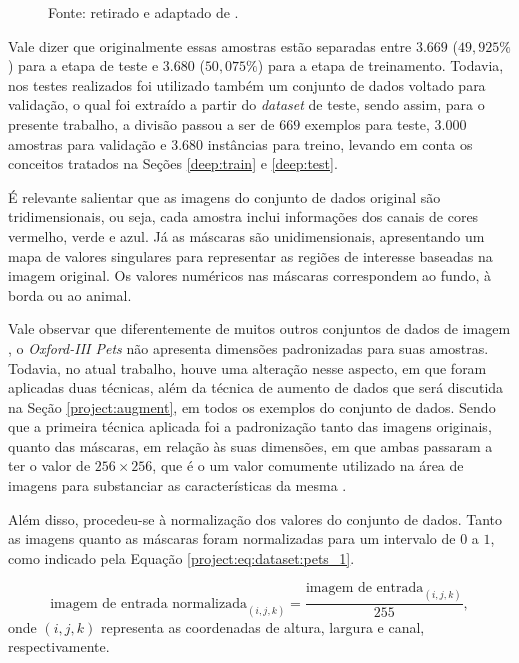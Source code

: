 \begin{figure}[H]
    Fonte: retirado e adaptado de \cite{Parkhi2012CatsDogs}.
\end{figure}

Vale dizer que originalmente essas amostras estão separadas entre $3.669$ ($49,925\%$) para a etapa de teste e $3.680$ ($50,075\%$) para a etapa de treinamento. Todavia, nos testes realizados foi utilizado também um conjunto de dados voltado para validação, o qual foi extraído a partir do \textit{dataset} de teste, sendo assim, para o presente trabalho, a divisão passou a ser de $669$ exemplos para teste, 3.000 amostras para validação e 3.680 instâncias para treino, levando em conta os conceitos tratados na Seções \ref{deep:train} e \ref{deep:test}.

É relevante salientar que as imagens do conjunto de dados original são tridimensionais, ou seja, cada amostra inclui informações dos canais de cores vermelho, verde e azul. Já as máscaras são unidimensionais, apresentando um mapa de valores singulares para representar as regiões de interesse baseadas na imagem original. Os valores numéricos nas máscaras correspondem ao fundo, à borda ou ao animal.

Vale observar que diferentemente de muitos outros conjuntos de dados de imagem \citep{Bossard2014Food-101Forests}, o \textit{Oxford-III Pets} não apresenta dimensões padronizadas para suas amostras. Todavia, no atual trabalho, houve uma alteração nesse aspecto, em que foram aplicadas duas técnicas, além da técnica de aumento de dados que será discutida na Seção \ref{project:augment}, em todos os exemplos do conjunto de dados. Sendo que a primeira técnica aplicada foi a padronização tanto das imagens originais, quanto das máscaras, em relação às suas dimensões, em que ambas passaram a ter o valor de $256 \times 256$, que é o um valor comumente utilizado na área de imagens para substanciar as características da mesma \citep{Lee1983DigitalFilter}.

Além disso, procedeu-se à normalização dos valores do conjunto de dados. Tanto as imagens quanto as máscaras foram normalizadas para um intervalo de $0$ a $1$, como indicado pela Equação \ref{project:eq:dataset:pets_1}.

\begin{equation}
    \label{project:eq:dataset:pets_1}
    \text{imagem de entrada normalizada}_{(i,j,k)} = \frac{\text{imagem de entrada}_{(i,j,k)}}{255},
\end{equation}
onde $(i,j,k)$ representa as coordenadas de altura, largura e canal, respectivamente.

